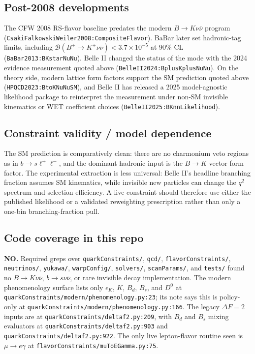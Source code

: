 \subsection*{Post-2008 developments}
The CFW 2008 RS-flavor baseline predates the modern \(B\to K\nu\bar{\nu}\)
program (\texttt{CsakiFalkowskiWeiler2008:CompositeFlavor}).  BaBar later set
hadronic-tag limits, including
\(\mathcal{B}(B^+\to K^+\nu\bar{\nu})<3.7\times10^{-5}\) at 90\% CL
(\texttt{BaBar2013:BKstarNuNu}).  Belle II changed the status of the mode with
the 2024 evidence measurement quoted above
(\texttt{BelleII2024:BplusKplusNuNu}).  On the theory side, modern lattice form
factors support the SM prediction quoted above
(\texttt{HPQCD2023:BtoKNuNuSM}), and Belle II has released a 2025
model-agnostic likelihood package to reinterpret the measurement under non-SM
invisible kinematics or WET coefficient choices
(\texttt{BelleII2025:BKnnLikelihood}).

\subsection*{Constraint validity / model dependence}
The SM prediction is comparatively clean: there are no charmonium veto regions
as in \(b\to s\ell^+\ell^-\), and the dominant hadronic input is the
\(B\to K\) vector form factor.  The experimental extraction is less universal:
Belle II's headline branching fraction assumes SM kinematics, while invisible
new particles can change the \(q^2\) spectrum and selection efficiency.  A live
constraint should therefore use either the published likelihood or a validated
reweighting prescription rather than only a one-bin branching-fraction pull.

\subsection*{Code coverage in this repo}
\textbf{NO.}  Required greps over \texttt{quarkConstraints/}, \texttt{qcd/},
\texttt{flavorConstraints/}, \texttt{neutrinos/}, \texttt{yukawa/},
\texttt{warpConfig/}, \texttt{solvers/}, \texttt{scanParams/}, and
\texttt{tests/} found no \(B\to K\nu\bar{\nu}\), \(b\to s\nu\bar{\nu}\), or
rare invisible decay implementation.  The modern phenomenology surface lists
only \(\epsilon_K\), \(K\), \(B_d\), \(B_s\), and \(D^0\) at
\texttt{quarkConstraints/modern/phenomenology.py:23}; its note says this is
policy-only at \texttt{quarkConstraints/modern/phenomenology.py:166}.  The
legacy \(\Delta F=2\) inputs are at \texttt{quarkConstraints/deltaf2.py:209},
with \(B_d\) and \(B_s\) mixing evaluators at
\texttt{quarkConstraints/deltaf2.py:903} and
\texttt{quarkConstraints/deltaf2.py:922}.  The only live lepton-flavor routine
seen is \(\mu\to e\gamma\) at \texttt{flavorConstraints/muToEGamma.py:75}.

